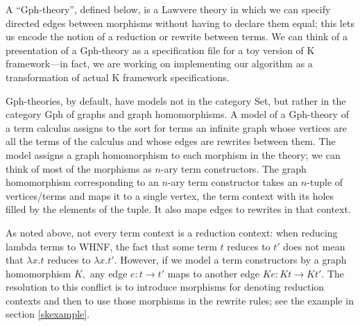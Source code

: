 \documentclass[a4paper,UKenglish]{article}
\newcommand{\maps}{\colon}
\begin{document}
A ``Gph-theory'', defined below, is a Lawvere theory in which we can specify directed edges between morphisms without having to declare them equal; this lets us encode the notion of a reduction or rewrite between terms.  We can think of a presentation of a Gph-theory as a specification file for a toy version of K framework---in fact, we are working on implementing our algorithm as a transformation of actual K framework specifications.  

Gph-theories, by default, have models not in the category Set, but rather in the category Gph of graphs and graph homomorphisms.  A model of a Gph-theory of a term calculus assigns to the sort for terms an infinite graph whose vertices are all the terms of the calculus and whose edges are rewrites between them.  The model assigns a graph homomorphism to each morphism in the theory; we can think of most of the morphisms as $n\mbox{-}$ary term constructors.  The graph homomorphism corresponding to an $n\mbox{-}$ary term constructor takes an $n\mbox{-}$tuple of vertices/terms and maps it to a single vertex, the term context with its holes filled by the elements of the tuple.  It also maps edges to rewrites in that context.

As noted above, not every term context is a reduction context: when reducing lambda terms to WHNF, the fact that some term $t$ reduces to $t'$ does not mean that $\lambda x.t$ reduces to $\lambda x.t'.$  However, if we model a term constructors by a graph homomorphism $K,$ any edge $e\maps t \to t'$ maps to another edge $Ke\maps Kt \to Kt'.$  The resolution to this conflict is to introduce morphisms for denoting reduction contexts and then to use those morphisms in the rewrite rules; see the example in section \ref{skexample}.
\end{document}
